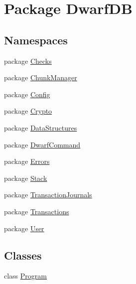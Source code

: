 \hypertarget{namespace_dwarf_d_b}{\section{Package Dwarf\+D\+B}
\label{namespace_dwarf_d_b}
}
\subsection*{Namespaces}
\begin{DoxyCompactItemize}
\item 
package \hyperlink{namespace_dwarf_d_b_1_1_checks}{Checks}
\item 
package \hyperlink{namespace_dwarf_d_b_1_1_chunk_manager}{Chunk\+Manager}
\item 
package \hyperlink{namespace_dwarf_d_b_1_1_config}{Config}
\item 
package \hyperlink{namespace_dwarf_d_b_1_1_crypto}{Crypto}
\item 
package \hyperlink{namespace_dwarf_d_b_1_1_data_structures}{Data\+Structures}
\item 
package \hyperlink{namespace_dwarf_d_b_1_1_dwarf_command}{Dwarf\+Command}
\item 
package \hyperlink{namespace_dwarf_d_b_1_1_errors}{Errors}
\item 
package \hyperlink{namespace_dwarf_d_b_1_1_stack}{Stack}
\item 
package \hyperlink{namespace_dwarf_d_b_1_1_transaction_journals}{Transaction\+Journals}
\item 
package \hyperlink{namespace_dwarf_d_b_1_1_transactions}{Transactions}
\item 
package \hyperlink{namespace_dwarf_d_b_1_1_user}{User}
\end{DoxyCompactItemize}
\subsection*{Classes}
\begin{DoxyCompactItemize}
\item 
class \hyperlink{class_dwarf_d_b_1_1_program}{Program}
\end{DoxyCompactItemize}
